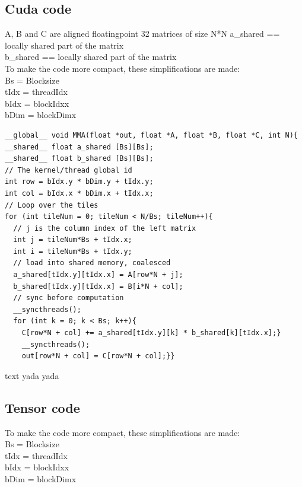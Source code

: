 \documentclass[conference]{IEEEtran}
\begin{document}
  \subsection{Cuda code}\label{sec:CudaCode}

  A, B and C are aligned floatingpoint 32 matrices of size N*N
  a\_shared == locally shared part of the matrix \\
  b\_shared == locally shared part of the matrix \\
  To make the code more compact, these simplifications are made:\\
  Bs = Blocksize \\
  tIdx = threadIdx \\
  bIdx = blockIdxx \\
  bDim = blockDimx
  \begin{lstlisting}
__global__ void MMA(float *out, float *A, float *B, float *C, int N){
__shared__ float a_shared [Bs][Bs];
__shared__ float b_shared [Bs][Bs];
// The kernel/thread global id
int row = bIdx.y * bDim.y + tIdx.y;
int col = bIdx.x * bDim.x + tIdx.x;
// Loop over the tiles
for (int tileNum = 0; tileNum < N/Bs; tileNum++){   
  // j is the column index of the left matrix
  int j = tileNum*Bs + tIdx.x;
  int i = tileNum*Bs + tIdx.y;
  // load into shared memory, coalesced
  a_shared[tIdx.y][tIdx.x] = A[row*N + j];
  b_shared[tIdx.y][tIdx.x] = B[i*N + col];
  // sync before computation
  __syncthreads();
  for (int k = 0; k < Bs; k++){
    C[row*N + col] += a_shared[tIdx.y][k] * b_shared[k][tIdx.x];}
    __syncthreads();
    out[row*N + col] = C[row*N + col];}}   
  \end{lstlisting}
  text yada yada
  
  \subsection{Tensor code}\label{sec:TensorCode}
  To make the code more compact, these simplifications are made:\\
  Bs = Blocksize \\
  tIdx = threadIdx \\
  bIdx = blockIdxx \\
  bDim = blockDimx
\end{document}
